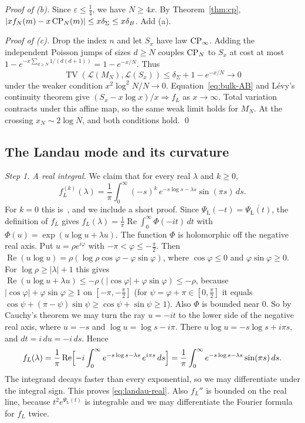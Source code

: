 \emph{Proof of (b).} Since $\varepsilon\le\frac14$, we have $N\ge4x$. By Theorem~\ref{thm:cp},
$\lvert xf_N(m)-x\,\mathrm{CP}_N(m)\rvert\le x\delta_\Sigma\le x\delta_B$. Add (a).

\emph{Proof of (c).} Drop the index $n$ and let $S_x$ have law
$\mathrm{CP}_\infty$. Adding the independent Poisson jumps of sizes $d\ge N$
couples $\mathrm{CP}_N$ to $S_x$ at cost at most
$1-e^{-x\sum_{d\ge N}1/(d(d+1))}=1-e^{-x/N}$. Thus
\[
 \operatorname{TV}(\mathcal L(M_N),\mathcal L(S_x))
 \le\delta_\Sigma+1-e^{-x/N}\longrightarrow0
\]
under the weaker condition $x^2\log^2N/N\to0$.
Equation~\eqref{eq:bulk-AB} and L\'evy's continuity theorem give
$(S_x-x\log x)/x\Rightarrow f_L$ as $x\to\infty$.
Total variation contracts under this affine map, so the same weak limit
holds for $M_N$. At the crossing $x_N\sim2\log N$, and both conditions
hold. \qed

\subsection{The Landau mode and its curvature}\label{app:bulk-mode}

\emph{Step 1. A real integral.} We claim that for every real $\lambda$ and
$k\ge0$,
\begin{equation}\label{eq:landau-real}
 f_L^{(k)}(\lambda)=\frac1\pi\int_0^\infty(-s)^k\,e^{-s\log s-\lambda s}\sin(\pi s)\,ds .
\end{equation}
For $k=0$ this is~\cite[Eq.~(4.3)]{mohle2005}, and we include a short proof.
Since $\Psi_{\mathrm L}(-t)=\overline{\Psi_{\mathrm L}(t)}$, the definition of $f_L$ gives
$f_L(\lambda)=\frac1\pi\operatorname{Re}\int_0^\infty\Phi(-it)\,dt$ with
$\Phi(u)=\exp(u\log u+\lambda u)$. The function $\Phi$ is holomorphic off the
negative real axis. Put $u=\rho e^{i\varphi}$ with
$-\pi<\varphi\le-\frac\pi2$. Then
$\operatorname{Re}(u\log u)=\rho(\log\rho\cos\varphi-\varphi\sin\varphi)$,
where $\cos\varphi\le0$ and $\varphi\sin\varphi\ge0$. For
$\log\rho\ge\lvert\lambda\rvert+1$ this gives
$\operatorname{Re}(u\log u+\lambda u)\le-\rho(\lvert\cos\varphi\rvert+\varphi\sin\varphi)\le-\rho$,
because $\lvert\cos\varphi\rvert+\varphi\sin\varphi\ge1$ on
$[-\pi,-\frac\pi2]$ (for $\psi=\varphi+\pi\in[0,\frac\pi2]$ it equals
$\cos\psi+(\pi-\psi)\sin\psi\ge\cos\psi+\sin\psi\ge1$). Also $\Phi$ is bounded
near $0$. So by Cauchy's theorem we may turn the ray $u=-it$ to the lower
side of the negative real axis, where $u=-s$ and $\log u=\log s-i\pi$. There
$u\log u=-s\log s+i\pi s$, and $dt=i\,du=-i\,ds$. Hence
\[
 f_L(\lambda)=\frac1\pi\operatorname{Re}\Bigl[-i\int_0^\infty
 e^{-s\log s-\lambda s}\,e^{i\pi s}\,ds\Bigr]
 =\frac1\pi\int_0^\infty e^{-s\log s-\lambda s}\sin(\pi s)\,ds .
\]
The integrand decays faster than every exponential, so we may differentiate
under the integral sign. This proves \eqref{eq:landau-real}. Also $f_L''$
is bounded on the real line, because $t^2e^{\Psi_{\mathrm L}(t)}$ is integrable and we may
differentiate the Fourier formula for $f_L$ twice.

